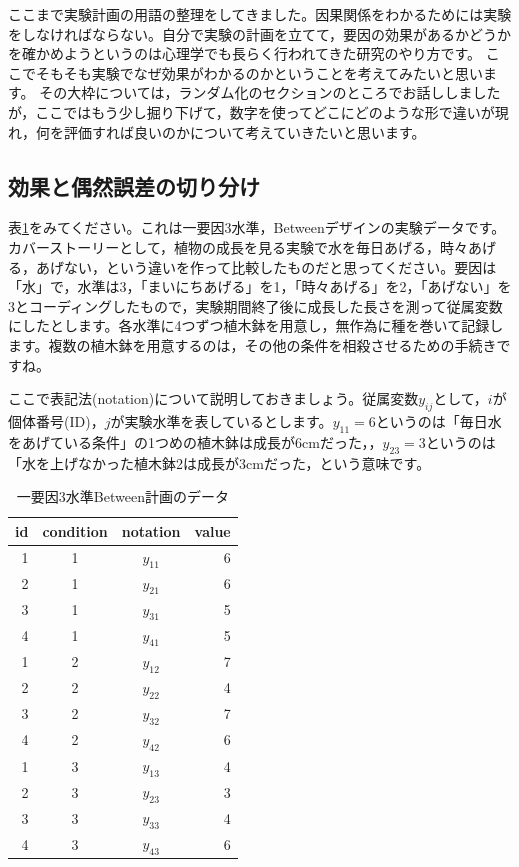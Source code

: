 \documentclass{ltjbook}
\begin{document}
ここまで実験計画の用語の整理をしてきました。因果関係をわかるためには実験をしなければならない。自分で実験の計画を立てて，要因の効果があるかどうかを確かめようというのは心理学でも長らく行われてきた研究のやり方です。
ここでそもそも実験でなぜ効果がわかるのかということを考えてみたいと思います。 その大枠については，ランダム化のセクションのところでお話ししましたが，ここではもう少し掘り下げて，数字を使ってどこにどのような形で違いが現れ，何を評価すれば良いのかについて考えていきたいと思います。

\subsection{効果と偶然誤差の切り分け}
\label{generalLinear}
表\ref{table::12_02}をみてください。これは一要因3水準，Betweenデザインの実験データです。カバーストーリーとして，植物の成長を見る実験で水を毎日あげる，時々あげる，あげない，という違いを作って比較したものだと思ってください。要因は「水」で，水準は3，「まいにちあげる」を1，「時々あげる」を2，「あげない」を3とコーディングしたもので，実験期間終了後に成長した長さを測って従属変数にしたとします。各水準に4つずつ植木鉢を用意し，無作為に種を巻いて記録します。複数の植木鉢を用意するのは，その他の条件を相殺させるための手続きですね。

ここで表記法(notation)について説明しておきましょう。従属変数$y_{ij}$として，$i$が個体番号(ID)，$j$が実験水準を表しているとします。$y_{11}=6$というのは「毎日水をあげている条件」の1つめの植木鉢は成長が6cmだった，，$y_{23}=3$というのは「水を上げなかった植木鉢2は成長が3cmだった，という意味です。

\begin{table}[ht]
    \centering
    \caption{一要因3水準Between計画のデータ}
    \begin{tabular}{rccr}
      \hline
    id & condition & notation & value \\ 
      \hline
      1 & 1 & $y_{11}$ & 6 \\ 
      2 & 1 & $y_{21}$ & 6 \\ 
      3 & 1 & $y_{31}$ & 5 \\ 
      4 & 1 & $y_{41}$ & 5 \\ 
      1 & 2 & $y_{12}$ & 7 \\ 
      2 & 2 & $y_{22}$ & 4 \\ 
      3 & 2 & $y_{32}$ & 7 \\ 
      4 & 2 & $y_{42}$ & 6 \\ 
      1 & 3 & $y_{13}$ & 4 \\ 
      2 & 3 & $y_{23}$ & 3 \\ 
      3 & 3 & $y_{33}$ & 4 \\ 
      4 & 3 & $y_{43}$ & 6 \\ 
       \hline
    \end{tabular}
    \label{table::12_02}
    \end{table}
\end{document}
